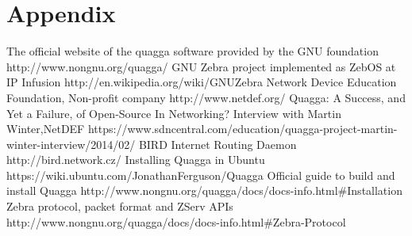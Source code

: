 \documentclass{article}
\begin{document}
\section{Appendix}
\label{sec:appendix}


\clearpage
\begin{thebibliography}{9}
  The official website of the quagga software provided by the GNU foundation http://www.nongnu.org/quagga/
  GNU Zebra project implemented as ZebOS at IP Infusion http://en.wikipedia.org/wiki/GNU\textunderscore Zebra
   Network Device Education Foundation, Non-profit company http://www.netdef.org/
   Quagga: A Success, and Yet a Failure, of Open-Source In Networking? Interview with Martin Winter,NetDEF https://www.sdncentral.com/education/quagga-project-martin-winter-interview/2014/02/
   BIRD Internet Routing Daemon http://bird.network.cz/
   Installing Quagga in Ubuntu https://wiki.ubuntu.com/JonathanFerguson/Quagga
   Official guide to build and install Quagga http://www.nongnu.org/quagga/docs/docs-info.html\#Installation
   Zebra protocol, packet format and ZServ APIs http://www.nongnu.org/quagga/docs/docs-info.html\#Zebra-Protocol
\end{thebibliography}
\end{document}
